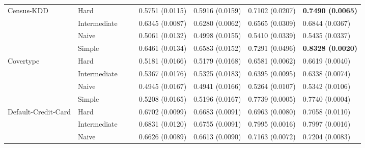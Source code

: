 \begin{tabular}{llllllll}
Census-KDD & Hard &                           &                           &           0.5751 (0.0115) &           0.5916 (0.0159) &           0.7102 (0.0207) &  \textbf{0.7490 (0.0065)} \\
                 & Intermediate &                           &                           &           0.6345 (0.0087) &           0.6280 (0.0062) &           0.6565 (0.0309) &           0.6844 (0.0367) \\
                 & Naive &                           &                           &           0.5061 (0.0132) &           0.4998 (0.0155) &           0.5410 (0.0339) &           0.5435 (0.0337) \\
                 & Simple &                           &                           &           0.6461 (0.0134) &           0.6583 (0.0152) &           0.7291 (0.0496) &  \textbf{0.8328 (0.0020)} \\
Covertype & Hard &                           &                           &           0.5181 (0.0166) &           0.5179 (0.0168) &           0.6581 (0.0062) &           0.6619 (0.0040) \\
                 & Intermediate &                           &                           &           0.5367 (0.0176) &           0.5325 (0.0183) &           0.6395 (0.0095) &           0.6338 (0.0074) \\
                 & Naive &                           &                           &           0.4945 (0.0167) &           0.4941 (0.0166) &           0.5264 (0.0107) &           0.5342 (0.0106) \\
                 & Simple &                           &                           &           0.5208 (0.0165) &           0.5196 (0.0167) &           0.7739 (0.0005) &           0.7740 (0.0004) \\
Default-Credit-Card & Hard &                           &                           &           0.6702 (0.0099) &           0.6683 (0.0091) &           0.6963 (0.0080) &           0.7058 (0.0110) \\
                 & Intermediate &                           &                           &           0.6831 (0.0120) &           0.6755 (0.0091) &           0.7995 (0.0016) &           0.7997 (0.0016) \\
                 & Naive &                           &                           &           0.6626 (0.0089) &           0.6613 (0.0090) &           0.7163 (0.0072) &           0.7204 (0.0083) \\

\end{tabular}

